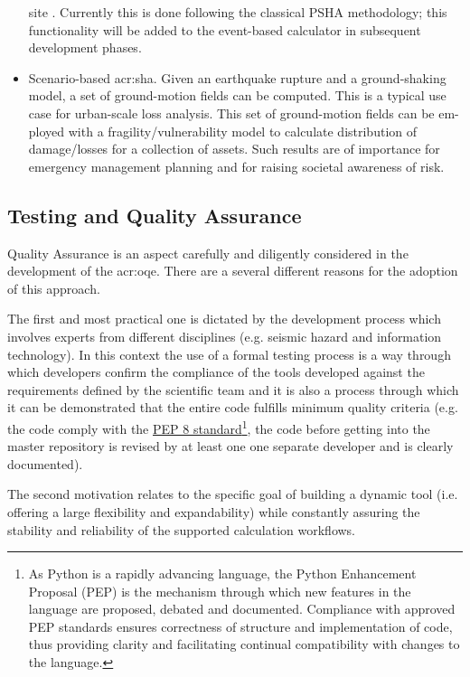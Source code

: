 \begin{itemize}
    site \parencite{bazzurro1999}. Currently this is done following 
    the classical PSHA methodology; this functionality will be added to 
    the event-based calculator in subsequent development phases.
\item Scenario-based \gls{acr:sha}. Given an earthquake rupture and a 
    ground-shaking model, a set of ground-motion fields can be computed. 
    This is a typical use case for urban-scale loss analysis. This set of
    ground-motion fields can be em- ployed with a fragility/vulnerability 
    model to calculate distribution of damage/losses for a collection of
    assets. Such results are of importance for emergency management planning
    and for raising societal awareness of risk.
\end{itemize}
%
\subsection{Testing and Quality Assurance}
%
Quality Assurance is an aspect carefully and diligently considered 
in the development of the \gls{acr:oqe}. There are a several 
different reasons for the adoption of this approach.

The first and most practical one is dictated by the development 
process which involves experts from different disciplines (e.g. 
seismic hazard and information technology). 
%
In this context the use of a formal testing process is a way through which
developers confirm the compliance of the tools developed against the
requirements defined by the scientific team and it is also a process through
which it can be demonstrated that the entire code fulfills minimum quality
criteria (e.g. the code comply with the
\href{http://legacy.python.org/dev/peps/pep-0008/}{PEP 8 standard}\footnote{As
Python is a rapidly advancing language, the Python Enhancement Proposal (PEP) is
the mechanism through which new features in the language are proposed, debated
and documented. Compliance with approved PEP standards ensures correctness of
structure and implementation of code, thus providing clarity and facilitating
continual compatibility with changes to the language.}, the code before getting
into the master repository is revised by at least one one separate developer and
is clearly documented).
 
The second motivation relates to the specific goal of building a dynamic tool
(i.e. offering a large flexibility and expandability) while constantly assuring
the stability and reliability of the supported calculation workflows.

